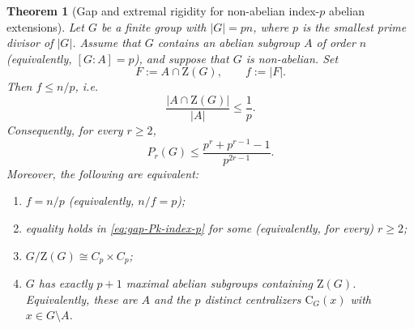 \documentclass[11pt]{article}
\newtheorem{theorem}{Theorem}[section]
\theoremstyle{definition}
\theoremstyle{remark}
\theoremstyle{definition}
\theoremstyle{plain}
\newcommand{\Z}{\mathrm{Z}}
\newcommand{\C}{\mathrm{C}}
\begin{document}
\begin{theorem}[Gap and extremal rigidity for non-abelian index-$p$ abelian extensions]\label{thm:gap-index-p-abelian}
Let $G$ be a finite group with $|G|=pn$, where $p$ is the smallest prime divisor of $|G|$.
Assume that $G$ contains an abelian subgroup $A$ of order $n$ (equivalently, $[G:A]=p$), and suppose that $G$ is non-abelian.
Set
\[
F:=A\cap \Z(G),\qquad f:=|F|.
\]
Then $f\le n/p$, i.e.
\[
\frac{|A\cap \Z(G)|}{|A|}\le \frac{1}{p}.
\]
Consequently, for every $r\ge 2$,
\begin{equation}\label{eq:gap-Pk-index-p}
P_r(G)\le \frac{p^r+p^{r-1}-1}{p^{2r-1}}.
\end{equation}
Moreover, the following are equivalent:
\begin{enumerate}
\item\label{it:extremal-f} $f=n/p$ (equivalently, $n/f=p$);
\item\label{it:extremal-Pk} equality holds in \eqref{eq:gap-Pk-index-p} for some (equivalently, for every) $r\ge 2$;
\item\label{it:extremal-quot} $G/\Z(G)\cong C_p\times C_p$;
\item\label{it:extremal-maxab} $G$ has exactly $p+1$ maximal abelian subgroups containing $\Z(G)$.
Equivalently, these are $A$ and the $p$ distinct centralizers $\C_G(x)$ with $x\in G\setminus A$.
\end{enumerate}
\end{theorem}
\end{document}
